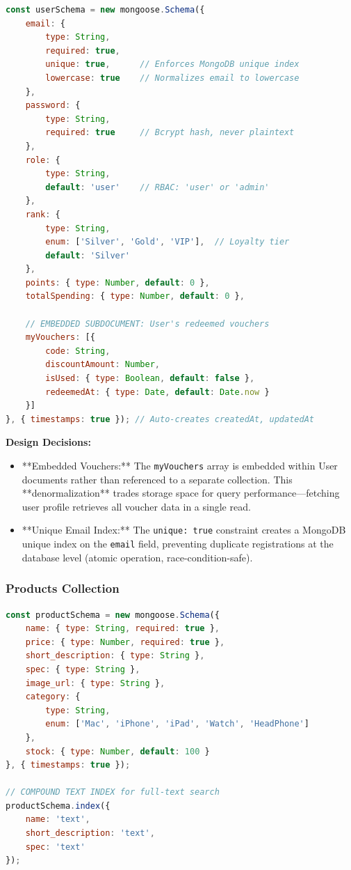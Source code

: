 \begin{lstlisting}[language=JavaScript, caption=User Schema (server.js:91-101)]
const userSchema = new mongoose.Schema({
    email: { 
        type: String, 
        required: true, 
        unique: true,      // Enforces MongoDB unique index
        lowercase: true    // Normalizes email to lowercase
    },
    password: { 
        type: String, 
        required: true     // Bcrypt hash, never plaintext
    },
    role: { 
        type: String, 
        default: 'user'    // RBAC: 'user' or 'admin'
    },
    rank: { 
        type: String, 
        enum: ['Silver', 'Gold', 'VIP'],  // Loyalty tier
        default: 'Silver' 
    },
    points: { type: Number, default: 0 },
    totalSpending: { type: Number, default: 0 },
    
    // EMBEDDED SUBDOCUMENT: User's redeemed vouchers
    myVouchers: [{
        code: String,
        discountAmount: Number,
        isUsed: { type: Boolean, default: false },
        redeemedAt: { type: Date, default: Date.now }
    }]
}, { timestamps: true }); // Auto-creates createdAt, updatedAt
\end{lstlisting}

\textbf{Design Decisions:}
\begin{itemize}
    \item **Embedded Vouchers:** The \texttt{myVouchers} array is embedded within User documents rather than referenced to a separate collection. This **denormalization** trades storage space for query performance—fetching user profile retrieves all voucher data in a single read.
    \item **Unique Email Index:** The \texttt{unique: true} constraint creates a MongoDB unique index on the \texttt{email} field, preventing duplicate registrations at the database level (atomic operation, race-condition-safe).
\end{itemize}

\subsubsection{Products Collection}

\begin{lstlisting}[language=JavaScript, caption=Product Schema (model/Product.js)]
const productSchema = new mongoose.Schema({
    name: { type: String, required: true },
    price: { type: Number, required: true },
    short_description: { type: String },
    spec: { type: String },
    image_url: { type: String },
    category: { 
        type: String,
        enum: ['Mac', 'iPhone', 'iPad', 'Watch', 'HeadPhone'] 
    },
    stock: { type: Number, default: 100 }
}, { timestamps: true });

// COMPOUND TEXT INDEX for full-text search
productSchema.index({
    name: 'text',
    short_description: 'text',
    spec: 'text'
});
\end{lstlisting}

